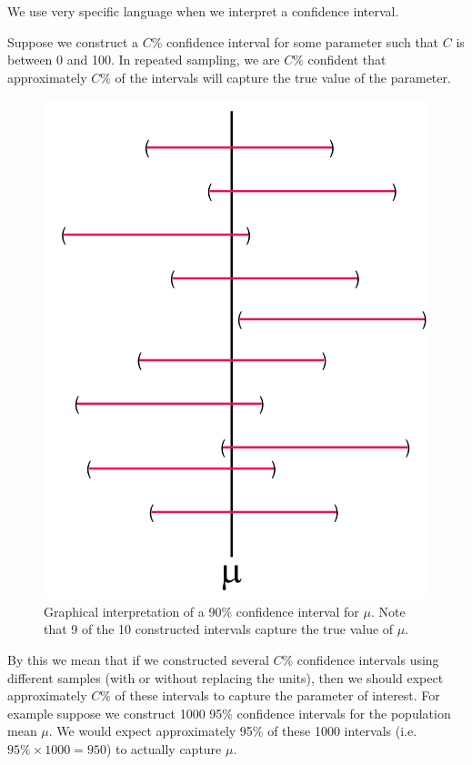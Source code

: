 We use very specific language when we interpret a confidence interval.

\begin{skeleton}[]
Suppose we construct a $C\%$ confidence interval for some parameter such that $C$ is between 0 and 100. In repeated sampling, we are $C\%$ confident that approximately $C\%$ of the intervals will capture the true value of the parameter.
\end{skeleton}

\begin{figure}
\centering
\includegraphics[scale=0.35]{Section6/confidenceinterval.pdf}
\caption{Graphical interpretation of a 90\% confidence interval for $\mu$. Note that 9 of the 10 constructed intervals capture the true value of $\mu$.}
\end{figure}

By this we mean that if we constructed several $C\%$ confidence intervals using different samples (with or without replacing the units), then we should expect approximately $C\%$ of these intervals to capture the parameter of interest. For example suppose we construct 1000 95\% confidence intervals for the population mean $\mu$. We would expect approximately 95\% of these 1000 intervals
(i.e. $95\% \times 1000 = 950$) to actually capture $\mu$.

